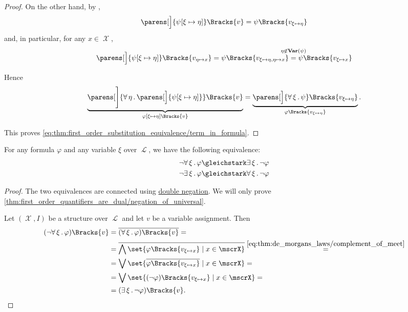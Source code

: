 \begin{proof}
  On the other hand, by ,
  \begin{equation*}
    \parens[\Big]{ \psi[\xi \mapsto \eta] }\Bracks{v} = \psi\Bracks{v_{\xi \mapsto \eta}}
  \end{equation*}
  and, in particular, for any \( x \in \mscrX \),
  \begin{equation*}
    \parens[\Big]{ \psi[\xi \mapsto \eta] }\Bracks{v_{\eta \mapsto x}}
    =
    \psi\Bracks{v_{\xi \mapsto \eta,\eta \mapsto x}}
    \ClapOverset {\eta \not\in \boldop{Var}(\psi)} =
    \psi\Bracks{v_{\xi \mapsto x}}
  \end{equation*}

  Hence
  \begin{equation*}
    \underbrace{ \parens[\Bigg]{\qforall \eta \parens[\Big]{ \psi[\xi \mapsto \eta] } }\Bracks{v} }_{\varphi[\xi \mapsto \eta]\Bracks{v}}
    =
    \underbrace{ \parens[\Big]{\qforall \xi \psi }\Bracks{v_{\xi \mapsto \eta}} }_{\varphi\Bracks{v_{\xi \mapsto \eta}}}.
  \end{equation*}

  This proves \eqref{eq:thm:first_order_substitution_equivalence/term_in_formula}.
\end{proof}

\begin{proposition}\label{thm:first_order_quantifiers_are_dual}
  For any formula \( \varphi \) and any variable \( \xi \) over \( \mscrL \), we have the following equivalence:
  \begin{align}
    \neg \qforall \xi \varphi &\gleichstark \qexists \xi \neg \varphi \label{thm:first_order_quantifiers_are_dual/negation_of_universal} \\
    \neg \qexists \xi \varphi &\gleichstark \qforall \xi \neg \varphi \label{thm:first_order_quantifiers_are_dual/negation_of_existential}
  \end{align}
\end{proposition}
\begin{proof}
  The two equivalences are connected using \hyperref[thm:boolean_equivalences/double_negation]{double negation}. We will only prove \eqref{thm:first_order_quantifiers_are_dual/negation_of_universal}.

  Let \( (\mscrX, I) \) be a structure over \( \mscrL \) and let \( v \) be a variable assignment. Then
  \begin{align*}
    (\neg \qforall \xi \varphi)\Bracks{v}
    &=
    \overline{(\qforall \xi \varphi)\Bracks{v}}
    = \\ &=
    \overline{\bigwedge\set{ \varphi\Bracks{v_{\xi \mapsto x}} \given x \in \mscrX }}
    \overset {\eqref{eq:thm:de_morgans_laws/complement_of_meet}} = \\ &=
    \bigvee\set{ \overline{\varphi\Bracks{v_{\xi \mapsto x}}} \given x \in \mscrX }
    = \\ &=
    \bigvee\set{ (\neg \varphi)\Bracks{v_{\xi \mapsto x}} \given x \in \mscrX }
    = \\ &=
    (\qexists \xi \neg \varphi)\Bracks{v}.
  \end{align*}
\end{proof}

